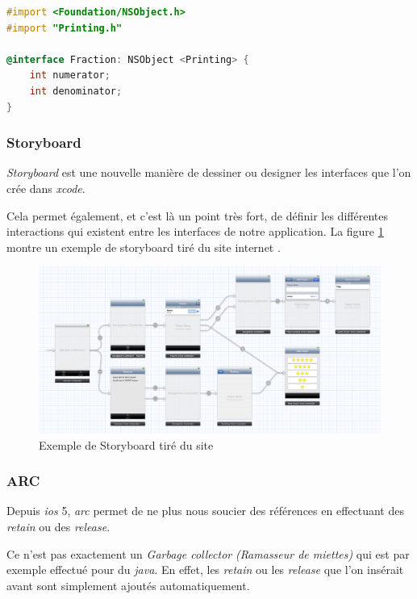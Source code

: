 \begin{lstlisting}[language={C}, caption={Suivre le protocole Printing}, label={lst:protocol2}]
#import <Foundation/NSObject.h>
#import "Printing.h"

@interface Fraction: NSObject <Printing> {
    int numerator;
    int denominator;
}
\end{lstlisting}
\subsubsection{Storyboard}
\emph{Storyboard} est une nouvelle manière de dessiner ou designer les interfaces que l'on crée dans \emph{\gls{xcode}}. 

\medskip

Cela permet également, et c'est là un point très fort, de définir les différentes interactions qui existent entre les interfaces de notre application. La figure \ref{gra:storyboard} montre un exemple de storyboard tiré du site internet \cite{online:RayWenderlich}.

\begin{figure}[H]
    	\centering
    	\includegraphics[width=\textwidth]{00_media/storyboard.png}
    	\caption{Exemple de Storyboard tiré du site \cite{online:RayWenderlich}}
    	\label{gra:storyboard}
\end{figure}

\subsubsection{ARC}
Depuis \emph{\gls{ios}} 5, \emph{\gls{arc}} permet de ne plus nous soucier des références en effectuant des \emph{retain} ou des \emph{release}.

\medskip

Ce n'est pas exactement un \emph{Garbage collector} \emph{(Ramasseur de miettes)} qui est par exemple effectué pour du \emph{\gls{java}}. En effet, les \emph{retain} ou les \emph{release} que l'on insérait avant sont simplement ajoutés automatiquement. 

